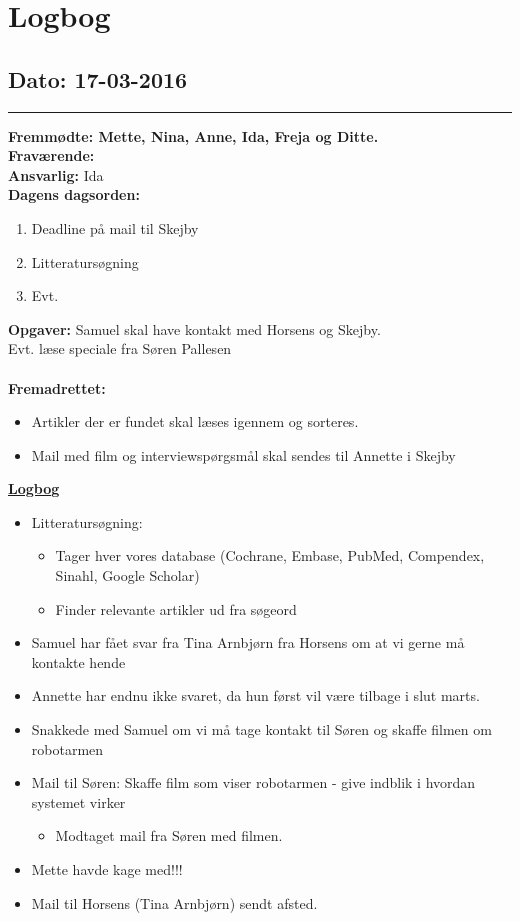 \chapter{Logbog}
\section{Dato: 17-03-2016}
\hrule
\textbf{Fremmødte: Mette, Nina, Anne, Ida, Freja og Ditte.} \\
\textbf{Fraværende:} \\
\textbf{Ansvarlig:} Ida \\
\textbf{Dagens dagsorden: }
\begin{enumerate}
	\item Deadline på mail til Skejby 
	\item Litteratursøgning 
	\item Evt.
\end{enumerate}

\textbf{Opgaver:} \newline
Samuel skal have kontakt med Horsens og Skejby.\\
Evt. læse speciale fra Søren Pallesen\\
\\
\textbf{Fremadrettet: }
\begin{itemize}
\item Artikler der er fundet skal læses igennem og sorteres.
\item Mail med film og interviewspørgsmål skal sendes til Annette i Skejby
\end{itemize}

\underline{\textbf{Logbog}}
\begin{itemize}
\item Litteratursøgning:
\begin{itemize}
\item Tager hver vores database (Cochrane, Embase, PubMed, Compendex, Sinahl, Google Scholar)
\item Finder relevante artikler ud fra søgeord
\end{itemize}
\item Samuel har fået svar fra Tina Arnbjørn fra Horsens om at vi gerne må kontakte hende
\item Annette har endnu ikke svaret, da hun først vil være tilbage i slut marts.
\item Snakkede med Samuel om vi må tage kontakt til Søren og skaffe filmen om robotarmen
\item Mail til Søren: Skaffe film som viser robotarmen - give indblik i hvordan systemet virker
\begin{itemize}
\item Modtaget mail fra Søren med filmen.
\end{itemize}
\item Mette havde kage med!!!
\item Mail til Horsens (Tina Arnbjørn) sendt afsted. 
\end{itemize}

\newpage